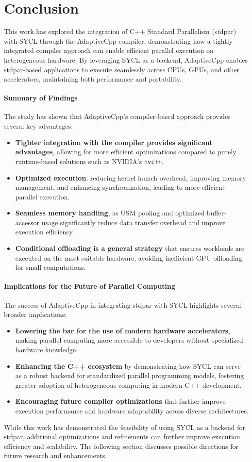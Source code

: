 \section{Conclusion}
\label{sec:conclusion}

This work has explored the integration of C++ Standard Parallelism (stdpar) with SYCL through the AdaptiveCpp
compiler, demonstrating how a tightly integrated compiler approach can enable efficient parallel execution on
heterogeneous hardware. By leveraging SYCL as a backend, AdaptiveCpp enables stdpar-based applications to
execute seamlessly across CPUs, GPUs, and other accelerators, maintaining both performance and portability.

\paragraph{Summary of Findings}
The study has shown that AdaptiveCpp’s compiler-based approach provides several key advantages:

\begin{itemize}
    \item \textbf{Tighter integration with the compiler provides significant advantages}, allowing for more efficient
          optimizations compared to purely runtime-based solutions such as NVIDIA’s \texttt{nvc++}.
    \item \textbf{Optimized execution}, reducing kernel launch overhead, improving memory management, and enhancing
          synchronization, leading to more efficient parallel execution.
    \item \textbf{Seamless memory handling}, as USM pooling and optimized buffer-accessor usage significantly reduce
          data transfer overhead and improve execution efficiency.
    \item \textbf{Conditional offloading is a general strategy} that ensures workloads are executed on the most suitable
          hardware, avoiding inefficient GPU offloading for small computations.
\end{itemize}

\paragraph{Implications for the Future of Parallel Computing}
The success of AdaptiveCpp in integrating stdpar with SYCL highlights several broader implications:

\begin{itemize}
    \item \textbf{Lowering the bar for the use of modern hardware accelerators}, making parallel computing more
          accessible to developers without specialized hardware knowledge.
    \item \textbf{Enhancing the C++ ecosystem} by demonstrating how SYCL can serve as a robust backend for standardized
          parallel programming models, fostering greater adoption of heterogeneous computing in modern C++
          development.
    \item \textbf{Encouraging future compiler optimizations} that further improve execution performance and hardware
          adaptability across diverse architectures.
\end{itemize}

While this work has demonstrated the feasibility of using SYCL as a backend for stdpar, additional optimizations
and refinements can further improve execution efficiency and scalability. The following section discusses possible
directions for future research and enhancements.
